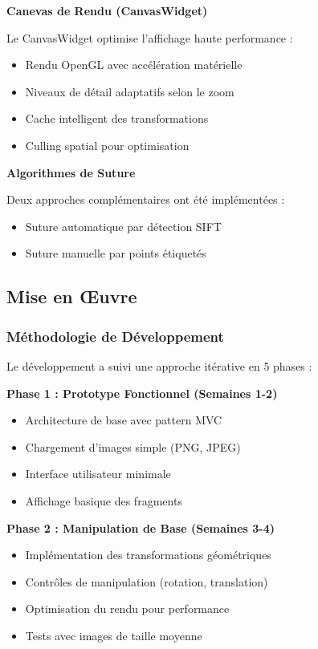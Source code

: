 \documentclass[12pt,a4paper]{article}
\begin{document}
\textbf{Canevas de Rendu (CanvasWidget)}

Le CanvasWidget optimise l'affichage haute performance :
\begin{itemize}
\item Rendu OpenGL avec accélération matérielle
\item Niveaux de détail adaptatifs selon le zoom
\item Cache intelligent des transformations
\item Culling spatial pour optimisation
\end{itemize}

\textbf{Algorithmes de Suture}

Deux approches complémentaires ont été implémentées :
\begin{itemize}
\item Suture automatique par détection SIFT
\item Suture manuelle par points étiquetés
\end{itemize}

\subsection{Mise en Œuvre}

\subsubsection{Méthodologie de Développement}

Le développement a suivi une approche itérative en 5 phases :

\textbf{Phase 1 : Prototype Fonctionnel (Semaines 1-2)}
\begin{itemize}
\item Architecture de base avec pattern MVC
\item Chargement d'images simple (PNG, JPEG)
\item Interface utilisateur minimale
\item Affichage basique des fragments
\end{itemize}

\textbf{Phase 2 : Manipulation de Base (Semaines 3-4)}
\begin{itemize}
\item Implémentation des transformations géométriques
\item Contrôles de manipulation (rotation, translation)
\item Optimisation du rendu pour performance
\item Tests avec images de taille moyenne
\end{itemize}
\end{document}
